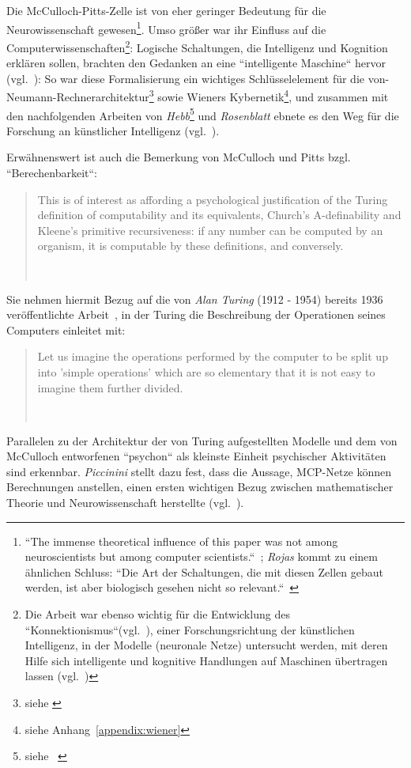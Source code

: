 Die McCulloch-Pitts-Zelle ist von eher geringer Bedeutung für die Neurowissenschaft gewesen\footnote{
    ``The immense theoretical influence of this paper was not among neuroscientists but among computer scientists.``~\cite[17]{AR88}; \textit{Rojas} kommt zu einem ähnlichen Schluss: ``Die Art der Schaltungen, die mit diesen Zellen gebaut werden, ist aber biologisch gesehen nicht so relevant.``~\cite[51]{Roj93}
}.
Umso größer war ihr Einfluss auf die Computerwissenschaften\footnote{
    Die Arbeit war ebenso wichtig für die Entwicklung des ``Konnektionismus``(vgl.~\cite[11]{Arb19}), einer Forschungsrichtung der künstlichen Intelligenz, in der Modelle (neuronale Netze) untersucht werden, mit deren Hilfe sich intelligente und kognitive Handlungen auf Maschinen übertragen lassen (vgl.~\cite[v]{Dor91})
}: Logische Schaltungen, die Intelligenz und Kognition erklären sollen, brachten den Gedanken an eine ``intelligente Maschine`` hervor (vgl.~\cite[204]{Pic04}): So war diese Formalisierung ein wichtiges Schlüsselelement für die von-Neumann-Rechnerarchitektur\footnote{siehe \cite{Neu93}} sowie Wieners Kybernetik\footnote{siehe Anhang~\ref{appendix:wiener}}, und zusammen mit den nachfolgenden Arbeiten von \textit{Hebb}\footnote{siehe ~\cite{Heb49}} und \textit{Rosenblatt} ebnete es den Weg für die Forschung an künstlicher Intelligenz (vgl.~\cite[1]{Arb19}).


Erwähnenswert ist auch die Bemerkung von McCulloch und Pitts bzgl. ``Berechenbarkeit``:

\blockquote[{~\cite[113]{MP43}}]{
    This is of interest as affording a psychological justification of the Turing definition of computability and its equivalents, Church’s A-definability and Kleene’s primitive recursiveness: if any number can be computed by an organism, it is computable by these definitions, and conversely.
}


Sie nehmen hiermit Bezug auf die von \textit{Alan Turing} (1912 - 1954) bereits 1936 veröffentlichte Arbeit~\cite{Tur37}, in der Turing die Beschreibung der Operationen seines Computers einleitet mit:

\blockquote[{~\cite[250]{Tur37}}]{
    Let us imagine the operations performed by the computer to be split up into 'simple operations' which are so elementary that it is not easy to imagine them further divided.
}


Parallelen zu der Architektur der von Turing aufgestellten Modelle und dem von McCulloch entworfenen ``psychon`` als kleinste Einheit psychischer Aktivitäten sind erkennbar. \textit{Piccinini} stellt dazu fest, dass die Aussage, MCP-Netze können Berechnungen anstellen, einen ersten wichtigen Bezug zwischen mathematischer Theorie und Neurowissenschaft herstellte (vgl.~\cite[197]{Pic04}).\\


